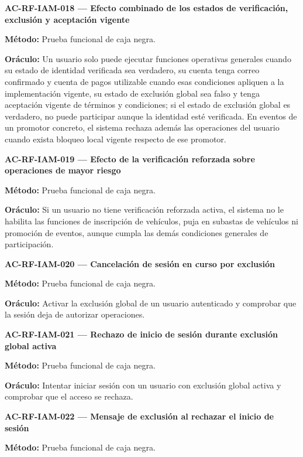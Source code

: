 \documentclass[10pt,letterpaper]{article}
\begin{document}
\noindent\textbf{AC-RF-IAM-018 --- Efecto combinado de los estados de verificación, exclusión y aceptación vigente}\par
\textbf{Método:} Prueba funcional de caja negra.\par
\textbf{Oráculo:} Un usuario solo puede ejecutar funciones operativas generales cuando su estado de identidad verificada sea verdadero, su cuenta tenga correo confirmado y cuenta de pagos utilizable cuando esas condiciones apliquen a la implementación vigente, su estado de exclusión global sea falso y tenga aceptación vigente de términos y condiciones; si el estado de exclusión global es verdadero, no puede participar aunque la identidad esté verificada. En eventos de un promotor concreto, el sistema rechaza además las operaciones del usuario cuando exista bloqueo local vigente respecto de ese promotor.\par\vspace{0.45em}
\noindent\textbf{AC-RF-IAM-019 --- Efecto de la verificación reforzada sobre operaciones de mayor riesgo}\par
\textbf{Método:} Prueba funcional de caja negra.\par
\textbf{Oráculo:} Si un usuario no tiene verificación reforzada activa, el sistema no le habilita las funciones de inscripción de vehículos, puja en subastas de vehículos ni promoción de eventos, aunque cumpla las demás condiciones generales de participación.\par\vspace{0.45em}
\noindent\textbf{AC-RF-IAM-020 --- Cancelación de sesión en curso por exclusión}\par
\textbf{Método:} Prueba funcional de caja negra.\par
\textbf{Oráculo:} Activar la exclusión global de un usuario autenticado y comprobar que la sesión deja de autorizar operaciones.\par\vspace{0.45em}
\noindent\textbf{AC-RF-IAM-021 --- Rechazo de inicio de sesión durante exclusión global activa}\par
\textbf{Método:} Prueba funcional de caja negra.\par
\textbf{Oráculo:} Intentar iniciar sesión con un usuario con exclusión global activa y comprobar que el acceso se rechaza.\par\vspace{0.45em}
\noindent\textbf{AC-RF-IAM-022 --- Mensaje de exclusión al rechazar el inicio de sesión}\par
\textbf{Método:} Prueba funcional de caja negra.\par
\end{document}
